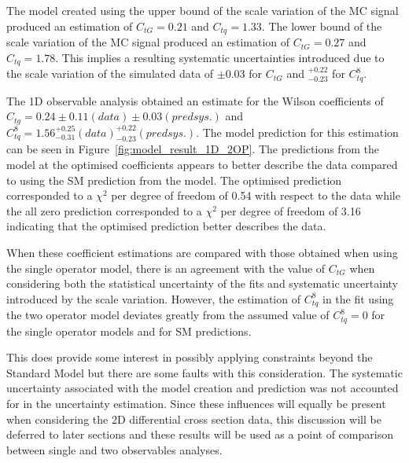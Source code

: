 \documentclass[a4paper,11pt]{article}
\begin{document}
The model created using the upper bound of the scale variation of the MC signal produced an estimation of $C_{tG}=0.21$ and $C_{tq}=1.33$.
The lower bound of the scale variation of the MC signal produced an estimation of $C_{tG}=0.27$ and $C_{tq}=1.78$.
This implies a resulting systematic uncertainties introduced due to the scale variation of the simulated data of $\pm 0.03$ for $C_{tG}$ and $^{+0.22}_{-0.23}$ for $C_{tq}^{8}$.

The 1D observable analysis obtained an estimate for the Wilson coefficients of $C_{tg} = 0.24 \pm 0.11 (data) \pm 0.03 (pred sys.)$ and $C_{tq}^{8}=1.56^{+0.25}_{-0.31} (data) ^{+0.22}_{-0.23} (pred sys.)$.
The model prediction for this estimation can be seen in Figure~\ref{fig:model_result_1D_2OP}.
The predictions from the model at the optimised coefficients appears to better describe the data compared to using the SM prediction from the model.
The optimised prediction corresponded to a $\chi^{2}$ per degree of freedom of 0.54 with respect to the data while the all zero prediction corresponded to a $\chi^{2}$ per degree of freedom of 3.16 indicating that the optimised prediction better describes the data.

When these coefficient estimations are compared with those obtained when using the single operator model, there is an agreement with the value of $C_{tG}$ when considering both the statistical uncertainty of the fits and systematic uncertainty introduced by the scale variation.
However, the estimation of $C_{tq}^{8}$ in the fit using the two operator model deviates greatly from the assumed value of $C_{tq}^{8}=0$ for the single operator models and for SM predictions.

This does provide some interest in possibly applying constraints beyond the Standard Model but there are some faults with this consideration.
The systematic uncertainty associated with the model creation and prediction was not accounted for in the uncertainty estimation.
Since these influences will equally be present when considering the 2D differential cross section data, this discussion will be deferred to later sections and these results will be used as a point of comparison between single and two observables analyses.
\end{document}
